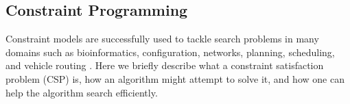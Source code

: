 
\subsection{Constraint Programming}\label{sec:cp}

Constraint models are successfully used to tackle search problems in many
domains such as bioinformatics, configuration, networks, planning, scheduling,
and vehicle routing \citep{DBLP:reference/fai/2}. Here we briefly describe what
a constraint satisfaction problem (CSP) is, how an algorithm might attempt to
solve it, and how one can help the algorithm search efficiently.

